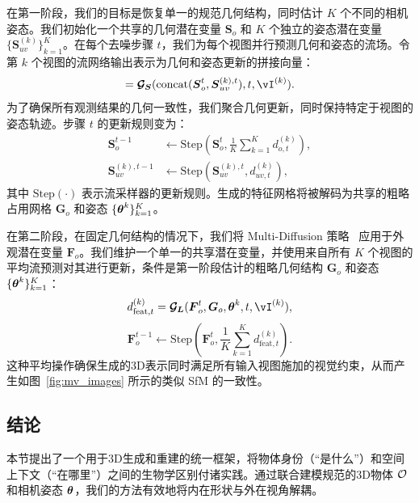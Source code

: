 \documentclass[../../book-main_zh.tex]{subfiles}
\begin{document}
在第一阶段，我们的目标是恢复单一的规范几何结构，同时估计 $K$ 个不同的相机姿态。我们初始化一个共享的几何潜在变量 $\boldsymbol{S}_{o}$ 和 $K$ 个独立的姿态潜在变量 $\{ \boldsymbol{S}_{uv}^{(k)} \}_{k=1}^K$。在每个去噪步骤 $t$，我们为每个视图并行预测几何和姿态的流场。令第 $k$ 个视图的流网络输出表示为几何和姿态更新的拼接向量：
\begin{equation}
    [d_{o, t}^{(k)}, d_{uv, t}^{(k)}] = \sflow(\text{concat}(\boldsymbol{S}_{o}^t, \boldsymbol{S}_{uv}^{(k), t}), t, \image^{(k)}).
\end{equation}
为了确保所有观测结果的几何一致性，我们聚合几何更新，同时保持特定于视图的姿态轨迹。步骤 $t$ 的更新规则变为：
\begin{equation}
\begin{aligned}
    \boldsymbol{S}_{o}^{t-1} &\leftarrow \text{Step}\left(\boldsymbol{S}_{o}^{t}, \frac{1}{K} \sum_{k=1}^K d_{o, t}^{(k)}\right), \\
    \boldsymbol{S}_{uv}^{(k), t-1} &\leftarrow \text{Step}\left(\boldsymbol{S}_{uv}^{(k), t}, d_{uv, t}^{(k)}\right),
\end{aligned}
\end{equation}
其中 $\text{Step}(\cdot)$ 表示流采样器的更新规则。生成的特征网格将被解码为共享的粗略占用网格 $\boldsymbol{G}_o$ 和姿态 $\{\boldsymbol{\theta}^{k}\}_{k=1}^{K}$。

在第二阶段，在固定几何结构的情况下，我们将 Multi-Diffusion 策略~\citep{bar2023multidiffusion} 应用于外观潜在变量 $\boldsymbol{F}_{o}$。我们维护一个单一的共享潜在变量，并使用来自所有 $K$ 个视图的平均流预测对其进行更新，条件是第一阶段估计的粗略几何结构 $\boldsymbol{G}_o$ 和姿态 $\{\boldsymbol{\theta}^{k}\}_{k=1}^{K}$：
\begin{equation}
    d_{\text{feat}, t}^{(k)} = \lflow(\boldsymbol{F}_{o}^t, \boldsymbol{G}_o, \pose^{k}, t, \image^{(k)}),
\end{equation}
\begin{equation}
    \boldsymbol{F}_{o}^{t-1} \leftarrow \text{Step}\left(\boldsymbol{F}_{o}^{t}, \frac{1}{K} \sum_{k=1}^K d_{\text{feat}, t}^{(k)}\right).
\end{equation}
这种平均操作确保生成的3D表示同时满足所有输入视图施加的视觉约束，从而产生如图~\ref{fig:mv_images} 所示的类似 SfM 的一致性。


\subsection{结论}
本节提出了一个用于3D生成和重建的统一框架，将物体身份（“是什么”）和空间上下文（“在哪里”）之间的生物学区别付诸实践。通过联合建模规范的3D物体 $\mathcal{O}$ 和相机姿态 $\boldsymbol{\theta}$，我们的方法有效地将内在形状与外在视角解耦。
\end{document}
